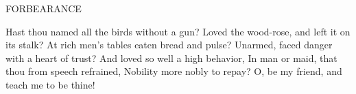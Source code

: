 FORBEARANCE

Hast thou named all the birds without a gun?
Loved the wood-rose, and left it on its stalk?
At rich men's tables eaten bread and pulse?
Unarmed, faced danger with a heart of trust?
And loved so well a high behavior,
In man or maid, that thou from speech refrained,
Nobility more nobly to repay?
O, be my friend, and teach me to be thine!
